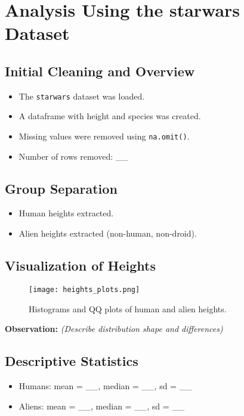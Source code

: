 \documentclass{article}
\begin{document}
\section{Analysis Using the starwars Dataset}

\subsection{Initial Cleaning and Overview}
\begin{itemize}
    \item The \texttt{starwars} dataset was loaded.
    \item A dataframe with height and species was created.
    \item Missing values were removed using \texttt{na.omit()}.
    \item Number of rows removed: \_\_
\end{itemize}

\subsection{Group Separation}
\begin{itemize}
    \item Human heights extracted.
    \item Alien heights extracted (non-human, non-droid).
\end{itemize}

\subsection{Visualization of Heights}
\begin{figure}[H]
    \centering
    \texttt{[image: heights\_plots.png]} %
    \caption{Histograms and QQ plots of human and alien heights.}
    \label{fig:height_dists}
\end{figure}

\textbf{Observation:} \textit{(Describe distribution shape and differences)}

\subsection{Descriptive Statistics}
\begin{itemize}
    \item Humans: mean = \_\_, median = \_\_, sd = \_\_
    \item Aliens: mean = \_\_, median = \_\_, sd = \_\_
\end{itemize}
\end{document}
